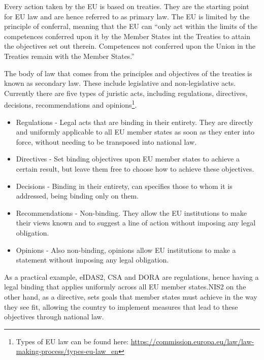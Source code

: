 \label{chap:euacts}

Every action taken by the \ac{EU} is based on treaties. They are the starting point for \ac{EU} law and are hence referred to as primary law. The \ac{EU} is limited by the principle of conferral, meaning that the \ac{EU} can ``only act within the limits of the competences conferred upon it by the Member States int the Treaties to attain the objectives set out therein. Competences not conferred upon the Union in the Treaties remain with the Member States.''\cite{TEU_Art5_2016} 

The body of law that comes from the principles and objectives of the treaties is known as secondary law. These include legislative and non-legislative acts.
Currently there are five types of juristic acts, including regulations, directives, decisions, recommendations and opinions\footnote{\label{fn:euCom}Types of \ac{EU} law can be found here: \url{https://commission.europa.eu/law/law-making-process/types-eu-law_en}}.
\begin{itemize}
    \item Regulations - Legal acts that are binding in their entirety. They are directly and uniformly applicable to all \ac{EU} member states as soon as they enter into force, without needing to be transposed into national law.
    \item Directives - Set binding objectives upon \ac{EU} member states to achieve a certain result, but leave them free to choose how to achieve these objectives. 
    \item Decisions - Binding in their entirety, can specifies those to whom it is addressed, being binding only on them.
    \item Recommendations - Non-binding. They allow the \ac{EU} institutions to make their views known and to suggest a line of action without imposing any legal obligation.
    \item Opinions - Also non-binding, opinions allow \ac{EU} institutions to make a statement without imposing any legal obligation.
\end{itemize}

As a practical example, \ac{eIDAS2}, \ac{CSA} and \ac{DORA} are regulations, hence having a legal binding that applies uniformly across all \ac{EU} member states.\ac{NIS2} on the other hand, as a directive, sets goals that member states must achieve in the way they see fit, allowing the country to implement measures that lead to these objectives through national law.

